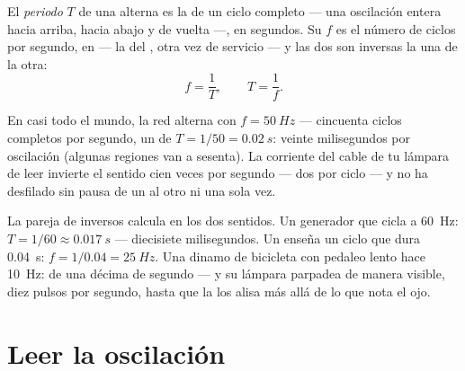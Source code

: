 \begin{definition}\label{def:g9:alternating-current:period}
El \emph{periodo} $T$ de una  alterna es la
 de un ciclo completo --- una oscilación entera hacia
arriba, hacia abajo y de vuelta ---, en segundos. Su
\emph{} $f$ es el número de ciclos por segundo, en
 --- la  del , otra vez de
servicio --- y las dos son inversas la una de la otra:
\[
f = \frac{1}{T}, \qquad T = \frac{1}{f}.
\]
\end{definition}

\begin{proposition}\label{prop:g9:alternating-current:mains}
En casi todo el mundo, la red alterna con $f = \qty{50}{Hz}$ ---
cincuenta ciclos completos por segundo, un  de $T = 1/50 =
\qty{0.02}{s}$: veinte milisegundos por oscilación (algunas regiones
van a sesenta). La corriente del cable de tu lámpara de leer invierte
el sentido cien veces por segundo --- dos por ciclo --- y no ha
desfilado sin pausa de un  al otro ni una sola vez.
\end{proposition}

\begin{example}\label{ex:g9:alternating-current:arithmetic}
La pareja de inversos calcula en los dos sentidos. Un generador que
cicla a \qty{60}{Hz}: $T = 1/60 \approx \qty{0.017}{s}$ --- diecisiete
milisegundos. Un  enseña un ciclo que dura
\qty{0.04}{s}: $f = 1/0.04 = \qty{25}{Hz}$. Una dinamo de bicicleta con
pedaleo lento hace \qty{10}{Hz}:  de una décima de segundo
--- y su lámpara parpadea de manera visible, diez pulsos por segundo,
hasta que la  los alisa más allá de lo que nota el ojo.
\end{example}

\section{Leer la oscilación}

